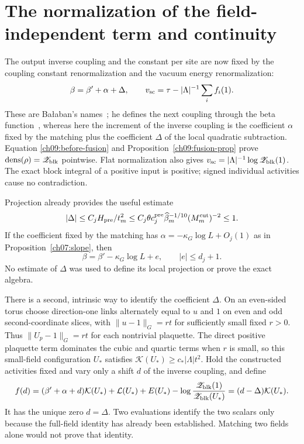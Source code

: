 \section{The normalization of the field-independent term and continuity}
\label{ch09:continuity}

The output inverse coupling and the constant per site are now fixed by the coupling constant renormalization and the vacuum energy renormalization:
\begin{equation}
 \beta=\beta'+\alpha+\Delta,\qquad
 v_{\rm sc}=\tau-|\Lambda|^{-1}\sum_i f_i(1).
 \label{ch09:reset}
\end{equation}
These are Ba{\l}aban's names~\cite{Balaban1987RG,Balaban1988Expansions}; he defines the next coupling through the beta function~\cite{Balaban1987RG}, whereas here the increment of the inverse coupling is the coefficient $\alpha$ fixed by the matching plus the coefficient $\Delta$ of the local quadratic subtraction. Equation \eqref{ch09:before-fusion} and
Proposition~\ref{ch09:fusion-prop} prove
$\operatorname{dens}(\rho)=\mathscr Z_{\rm blk}$ pointwise.
Flat normalization also gives
$v_{\rm sc}=|\Lambda|^{-1}\log\mathscr Z_{\rm blk}(1)$.
The exact block integral of a positive input is positive;
signed individual activities cause no contradiction.

Projection already provides the useful estimate
\[
 |\Delta|\le C_jH_{\rm pre}/t_m^2
       \le C_j\theta c_j^{\rm pre}
                   \widehat\beta_m^{-1/10}(M_m^{\rm cut})^{-2}
       \le1 .
\]
If the coefficient fixed by the matching has
$\alpha=-\kappa_G\log L+O_j(1)$ as in
Proposition~\ref{ch07:slope}, then
\begin{equation}
       \beta=\beta'-\kappa_G\log L+e,\qquad |e|\le d_j+1.
 \label{ch09:drift}
\end{equation}
No estimate of $\Delta$ was used to define its local
projection or prove the exact algebra.

There is a second, intrinsic way to identify the coefficient $\Delta$.
On an even-sided torus choose direction-one links alternately
equal to $u$ and $1$ on even and odd second-coordinate
slices, with $\|u-1\|_G=rt$ for sufficiently small fixed $r>0$.
Thus $\|U_p-1\|_G=rt$ for each nontrivial plaquette. The direct
positive plaquette term dominates the cubic and quartic
terms when $r$ is small, so this small-field configuration
$U_*$ satisfies $\mathcal K(U_*)\ge c_*|\Lambda|t^2$.
Hold the constructed activities fixed and vary only a shift
$d$ of the inverse coupling, and define
\[
 f(d)=(\beta'+\alpha+d)\mathcal K(U_*)+\mathcal L(U_*)+
 E(U_*)-\log\frac{\mathscr Z_{\rm blk}(1)}{\mathscr Z_{\rm blk}(U_*)}
       =(d-\Delta)\mathcal K(U_*).
\]
It has the unique zero $d=\Delta$.
Two evaluations identify the two scalars only because the
full-field identity has already been established.
Matching two fields alone would not prove that identity.

